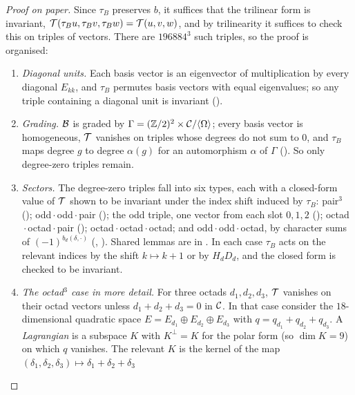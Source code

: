 \begin{proof}[Proof on paper]
Since $\tau_B$ preserves $b$, it suffices that the trilinear form is invariant,
$\mathcal{T}(\tau_Bu,\tau_Bv,\tau_Bw)=\mathcal{T}(u,v,w)$, and by trilinearity it suffices to check this on triples of
 vectors.  There are $196884^3$ such triples, so the proof is organised:
\begin{enumerate}[label=(\roman*)]
\item \emph{Diagonal units.}  Each basis vector is an eigenvector of multiplication by every diagonal
  $E_{kk}$, and $\tau_B$ permutes basis vectors with equal eigenvalues; so any triple containing a
  diagonal unit is invariant ().
\item \emph{Grading.}  $\mathcal{B}$ is graded by $\Gamma=({\mathbb{Z}}/2)^2\times\mathcal{C}/\langle\Omega\rangle$; every
  basis vector is homogeneous, $\mathcal{T}$ vanishes on triples whose degrees do not sum to $0$, and $\tau_B$
  maps degree $g$ to degree $\alpha(g)$ for an automorphism $\alpha$ of $\Gamma$
  ().  So only degree-zero triples remain.
\item \emph{Sectors.}  The degree-zero triples fall into six types, each with a closed-form value of
  $\mathcal{T}$ shown to be invariant under the index shift induced by $\tau_B$: pair${}^3$
  (); odd${}\cdot{}$odd${}\cdot{}$pair
  (); the odd triple, one vector from each slot $0,1,2$
  (); octad${}\cdot{}$octad${}\cdot{}$pair
  (); octad${}\cdot{}$octad${}\cdot{}$octad; and
  odd${}\cdot{}$odd${}\cdot{}$octad, by character sums of $(-1)^{b_d(\delta,\cdot)}$
  (, ).  Shared lemmas are in
  .  In each case $\tau_B$ acts on the relevant indices by the shift
  $k\mapsto k+1$ or by $H_dD_d$, and the closed form is checked to be invariant.
\item \emph{The octad${}^3$ case in more detail.}  For three octads $d_1,d_2,d_3$, $\mathcal{T}$ vanishes on
  their octad vectors unless $d_1+d_2+d_3=0$ in $\mathcal{C}$.  In that case consider the $18$-dimensional
  quadratic space $E=E_{d_1}\oplus E_{d_2}\oplus E_{d_3}$ with $q=q_{d_1}+q_{d_2}+q_{d_3}$.  A
  \emph{Lagrangian} is a subspace $K$ with $K^\perp=K$ for the polar form (so $\dim K=9$) on which $q$
  vanishes.  The relevant $K$ is the kernel of the map $(\delta_1,\delta_2,\delta_3)\mapsto\delta_1+\delta_2+\delta_3$

\end{enumerate}
\end{proof}
